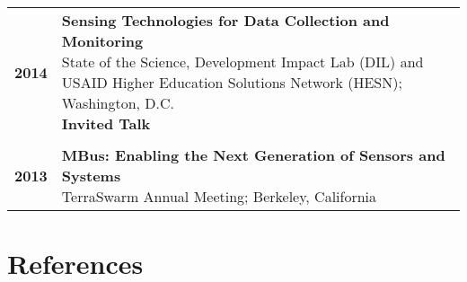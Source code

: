 \documentclass{article}
\begin{document}
\begin{longtable}{>{\bf}p{1cm} l}
  2014 & \makecell{
    \textbf{Sensing Technologies for Data Collection and Monitoring} \\
    State of the Science, Development Impact Lab (DIL) and USAID Higher Education Solutions Network (HESN); Washington, D.C. \\
    \textbf{\color{BrickRed} Invited Talk} \\
  } \\

  \\

  2013 & \makecell{
    \textbf{MBus: Enabling the Next Generation of Sensors and Systems} \\
    TerraSwarm Annual Meeting; Berkeley, California \\
  } \\
\end{longtable}

\renewcommand{\arraystretch}{1.0}



\section*{References}
\end{document}

